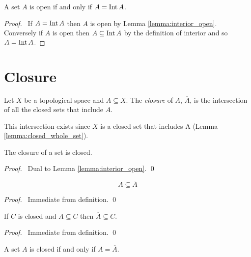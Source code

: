 \begin{lemma}
    \label{lemma:open_interior}
    A set $A$ is open if and only if $A = \operatorname{Int} A$.
\end{lemma}

\begin{proof}
    \pf\ If $A = \operatorname{Int} A$ then $A$ is open by Lemma \ref{lemma:interior_open}. Conversely if
    $A$ is open then $A \subseteq \operatorname{Int} A$ by the definition of interior and so $A = \operatorname{Int} A$.
\end{proof}

\section{Closure}

\begin{definition}[Closure]
    Let $X$ be a topological space and $A \subseteq X$. The \emph{closure} of $A$, $\overline{A}$, is the
    intersection of all the closed sets that include $A$.
\end{definition}

This intersection exists since $X$ is a closed set that includes A (Lemma \ref{lemma:closed_whole_set}).

\begin{lemma}
    The closure of a set is closed.
\end{lemma}

\begin{proof}
    \pf\ Dual to Lemma \ref{lemma:interior_open}. \qed
\end{proof}

\begin{lemma}
    \label{lemma:closure_subset}
    \[ A \subseteq \overline{A} \]
\end{lemma}

\begin{proof}
    \pf\ Immediate from definition. \qed
\end{proof}

\begin{lemma}
    If $C$ is closed and $A \subseteq C$ then $\overline{A} \subseteq C$.
\end{lemma}

\begin{proof}
    \pf\ Immediate from definition. \qed
\end{proof}

\begin{lemma}
    A set $A$ is closed if and only if $A = \overline{A}$.
\end{lemma}


